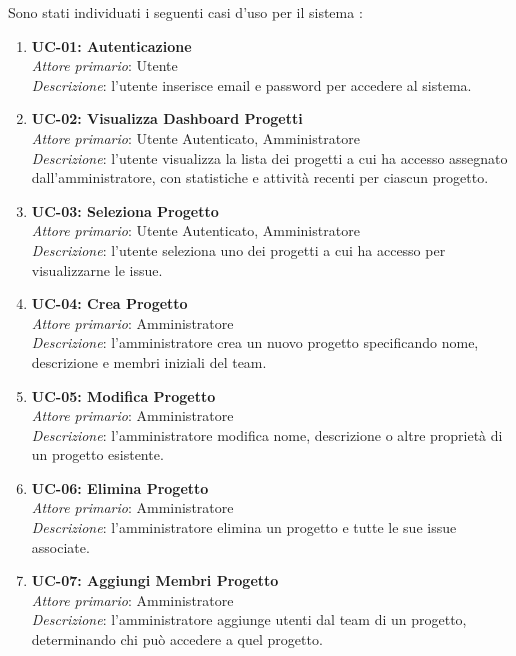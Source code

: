 Sono stati individuati i seguenti casi d'uso per il sistema \productname:

\begin{enumerate}[leftmargin=1.1em]

\item \textbf{UC-01: Autenticazione} \\
\textit{Attore primario}: Utente \\
\textit{Descrizione}: l'utente inserisce email e password per accedere al sistema.

\item \textbf{UC-02: Visualizza Dashboard Progetti} \\
\textit{Attore primario}: Utente Autenticato, Amministratore \\
\textit{Descrizione}: l'utente visualizza la lista dei progetti a cui ha accesso assegnato dall'amministratore, con statistiche e attività recenti per ciascun progetto.

\item \textbf{UC-03: Seleziona Progetto} \\
\textit{Attore primario}: Utente Autenticato, Amministratore \\
\textit{Descrizione}: l'utente seleziona uno dei progetti a cui ha accesso per visualizzarne le issue.

\item \textbf{UC-04: Crea Progetto} \\
\textit{Attore primario}: Amministratore \\
\textit{Descrizione}: l'amministratore crea un nuovo progetto specificando nome, descrizione e membri iniziali del team.

\item \textbf{UC-05: Modifica Progetto} \\
\textit{Attore primario}: Amministratore \\
\textit{Descrizione}: l'amministratore modifica nome, descrizione o altre proprietà di un progetto esistente.

\item \textbf{UC-06: Elimina Progetto} \\
\textit{Attore primario}: Amministratore \\
\textit{Descrizione}: l'amministratore elimina un progetto e tutte le sue issue associate.

\item \textbf{UC-07: Aggiungi Membri Progetto} \\
\textit{Attore primario}: Amministratore \\
\textit{Descrizione}: l'amministratore aggiunge utenti dal team di un progetto, determinando chi può accedere a quel progetto.


\end{enumerate}
